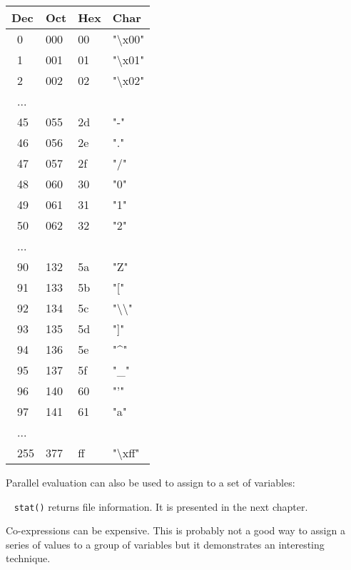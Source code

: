 \begin{center}
\begin{xtabular}{m{2.00cm}m{2.00cm}m{2.00cm}m{2.00cm}}\\
{\sffamily\bfseries Dec} &
{\sffamily\bfseries Oct} &
{\sffamily\bfseries Hex} &
{\sffamily\bfseries Char}\\\hline
\ 0  &  000  &  00  &  "{\textbackslash}x00"\\
\ 1  &  001  &  01  &  "{\textbackslash}x01"\\
\ 2  &  002  &  02  &  "{\textbackslash}x02"\\
\ ...\\
\ 45  &  055  &  2d  &  "-"\\
\ 46  &  056  &  2e  &  "."\\
\ 47  &  057  &  2f  &  "/"\\
\ 48  &  060  &  30  &  "0"\\
\ 49  &  061  &  31  &  "1"\\
\ 50  &  062  &  32  &  "2"\\
\ ...\\
\ 90  &  132  &  5a  &  "Z"\\
\ 91  &  133  &  5b  &  "["\\
\ 92  &  134  &  5c  &  "{\textbackslash}{\textbackslash}"\\
\ 93  &  135  &  5d  &  "]"\\
\ 94  &  136  &  5e  &  "\^{}"\\
\ 95  &  137  &  5f  &  "\_"\\
\ 96  &  140  &  60  &  "'"\\
\ 97  &  141  &  61  &  "a"\\
\ ...\\
\ 255  &  377  &  ff  &  "{\textbackslash}xff"\\
\end{xtabular}
\end{center}

\noindent
Parallel evaluation can also be used to assign to a set of variables:


\bigskip\bigskip{}\
{\sffamily
\texttt{stat()} returns file information. It is presented in the next chapter.}

\noindent
Co-expressions can be expensive. This is probably not a
good way to assign a series of values to a group of variables but it
demonstrates an interesting technique.

